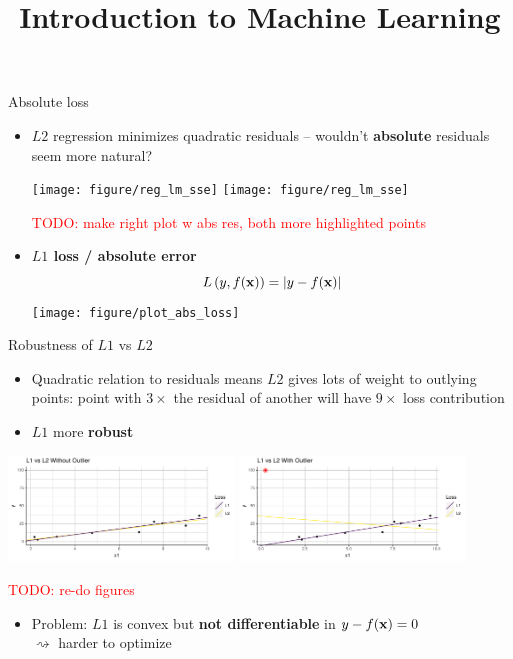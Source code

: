 \documentclass[11pt,compress,t,notes=noshow, xcolor=table]{beamer}
\title{Introduction to Machine Learning}
\institute{\href{https://compstat-lmu.github.io/lecture_i2ml/}{compstat-lmu.github.io/lecture\_i2ml}}
\date{}
\begin{document}


\begin{vbframe}{Absolute loss}

\begin{itemize}
    \item $L2$ regression minimizes quadratic residuals -- wouldn't 
    \textbf{absolute} residuals seem more natural? 
    
    \vspace{0.2cm}
    \texttt{[image: figure/reg\_lm\_sse]}
    \texttt{[image: figure/reg\_lm\_sse]}
    
    \textcolor{red}{TODO: make right plot w abs res, both more highlighted 
    points
    }
    \item \textbf{$L1$ loss / absolute error}
    $$
    L\left(y, f(\mathbf{x})\right) = |y-f(\mathbf{x})|
    $$
    \texttt{[image: figure/plot\_abs\_loss]} 
\end{itemize}

\end{vbframe}


\begin{vbframe}{Robustness of $L1$ vs $L2$}

\begin{itemize}
    \item Quadratic relation to residuals means $L2$ gives lots of weight to 
    outlying points: point with $3 \times$ the residual of another will have 
    $9 \times$ loss contribution
    \item $L1$ more \textbf{robust}
\end{itemize}

\vfill
\includegraphics[width=0.45\textwidth]{figure_man/l2-vs-l1-1.pdf}
\includegraphics[width=0.45\textwidth]{figure_man/l2-vs-l1-2.pdf}

\textcolor{red}{TODO: re-do figures}

\vfill
\begin{itemize}
    \item Problem: $L1$ is convex but \textbf{not differentiable} in 
    $y - f(\mathbf{x}) = 0$ \\$\rightsquigarrow$ harder to optimize
\end{itemize}

\end{vbframe}

\endlecture
\end{document}
